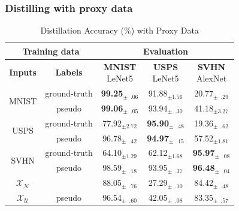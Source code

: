 \subsubsection{Distilling with proxy data} \label{sssec:04-experiments-ablation-naiveapproaches}
\begin{table}[ht] %
    \caption{Distillation Accuracy (\%) with Proxy Data}
    \centering
    \begin{tabular}{c|c|c|c|c}
        \hline \multicolumn{2}{c|}{\textbf{Training data}} & \multicolumn{3}{c}{\textbf{Evaluation}} \\
        \hline \textbf{Inputs} & \textbf{Labels}          & \makecell{\textbf{MNIST} \\ LeNet5} & \makecell{\textbf{USPS} \\ LeNet5} & \makecell{\textbf{SVHN} \\ AlexNet} \\
        \hline \multirow{2}{*}{MNIST}    & ground-truth & \textbf{99.25}$_{\pm  \phantom{0}.06}$ &          91.88$_{\pm           1.56}$ &          20.77$_{\pm \phantom{0}.29}$ \\
                                         & pseudo       & \textbf{99.06}$_{\pm  \phantom{0}.05}$ &          93.94$_{\pm \phantom{0}.30}$ &          41.18$_{\pm           3.27}$ \\
        \hline \multirow{2}{*}{USPS}     & ground-truth &          77.92$_{\pm            2.72}$ & \textbf{95.90}$_{\pm \phantom{0}.48}$ &          19.36$_{\pm \phantom{0}.62}$ \\
                                         & pseudo       &          96.78$_{\pm  \phantom{0}.42}$ & \textbf{94.97}$_{\pm \phantom{0}.15}$ &          57.52$_{\pm           1.81}$ \\
        \hline \multirow{2}{*}{SVHN}     & ground-truth &          64.10$_{\pm            1.29}$ &          62.12$_{\pm           1.68}$ & \textbf{95.97}$_{\pm \phantom{0}.08}$ \\
                                         & pseudo       &          98.59$_{\pm  \phantom{0}.18}$ &          93.95$_{\pm \phantom{0}.37}$ & \textbf{96.48}$_{\pm \phantom{0}.04}$ \\
        \hline $\mathcal{X}_\mathcal{N}$ &              &          88.05$_{\pm  \phantom{0}.76}$ &          27.29$_{\pm \phantom{0}.10}$ &          84.42$_{\pm \phantom{0}.48}$ \\
               $\mathcal{X}_\mathcal{U}$ & pseudo       &          96.54$_{\pm  \phantom{0}.60}$ &          42.05$_{\pm \phantom{0}.08}$ &          83.35$_{\pm \phantom{0}.57}$ \\

\end{tabular}
\end{table}
